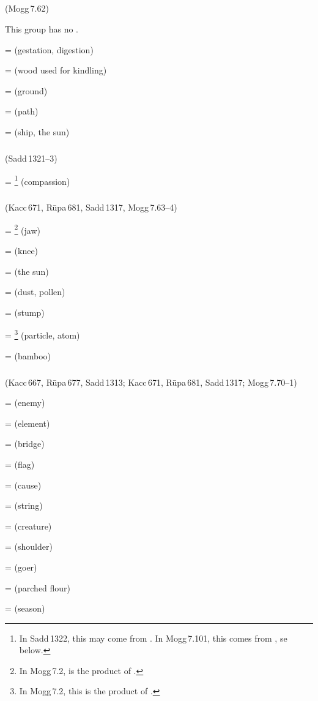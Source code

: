 \subparagraph*{} (Mogg\,7.62)\label{pacckx:adni}

This group has no .

 =  (gestation, digestion)\par
{} =  (wood used for kindling)\par
{} =  (ground)\par
{} =  (path)\par
{} =  (ship, the sun)\par

\subparagraph*{} (Sadd\,1321--3)\label{pacckx:rudna}

 = \footnote{In Sadd\,1322, this may come from . In Mogg\,7.101, this comes from , se below.} (compassion)\par

\subparagraph*{} (Kacc\,671, R\=upa\,681, Sadd\,1317, Mogg\,7.63--4)\label{pacckx:dnu2}

 = \footnote{In Mogg\,7.2,  is the product of .} (jaw)\par
{} =  (knee)\par
{} =  (the sun)\par
{} =  (dust, pollen)\par
{} =  (stump)\par
{} = \footnote{In Mogg\,7.2, this is the product of .} (particle, atom)\par
{} =  (bamboo)\par

\subparagraph*{} (Kacc\,667, R\=upa\,677, Sadd\,1313; Kacc\,671, R\=upa\,681, Sadd\,1317; Mogg\,7.70--1)\label{pacckx:tu}

 =  (enemy)\par
{} =  (element)\par
{} =  (bridge)\par
{} =  (flag)\par
{} =  (cause)\par
{} =  (string)\par
{} =  (creature)\par
{} =  (shoulder)\par
{} =  (goer)\par
{} =  (parched flour)\par
{} =  (season)\par

